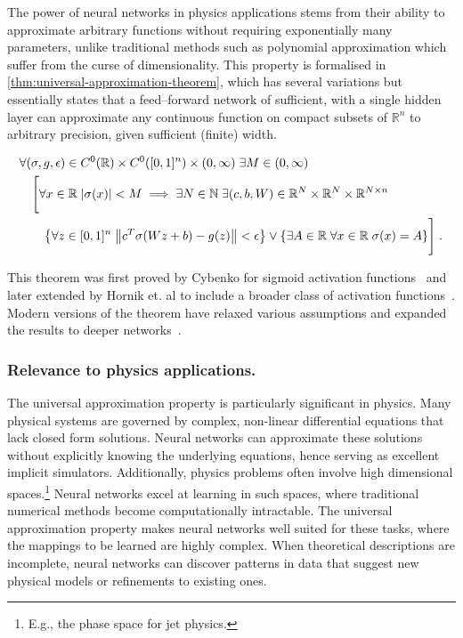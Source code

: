         The power of neural networks in physics applications stems from their ability to approximate arbitrary functions without requiring exponentially many parameters, unlike traditional methods such as polynomial approximation which suffer from the curse of dimensionality.
        This property is formalised in \cref{thm:universal-approximation-theorem}, which has several variations but essentially states that a feed--forward network of sufficient, with a single hidden layer can approximate any continuous function on compact subsets of \(\mathbb{R}^n\) to arbitrary precision, given sufficient (finite) width.
        \begin{theorem}
            \noproofref
            \label{thm:universal-approximation-theorem}
        \begin{align}
            &\forall (\sigma, g, \epsilon)\in C^0(\mathbb{R})\times C^0([0, 1]^n)\times (0,\infty)\;\exists M\in(0, \infty)\\
            \nonumber&\quad \Bigg[\forall x\in\mathbb{R}\;|\sigma(x)| < M \implies \exists N\in\mathbb{N}\;\exists (c, b, W)\in \mathbb{R}^N\times \mathbb{R}^N\times \mathbb{R}^{N\times n}\\
            \nonumber&\qquad\qty{\forall z\in[0, 1]^n\;\norm{c^T\sigma(Wz + b) - g(z)} <\epsilon} \lor \qty{\exists A\in\mathbb{R}\;\forall x\in\mathbb{R}\;\sigma(x) = A}\Bigg]\;.
            \end{align}
        \end{theorem}
        This theorem was first proved by Cybenko for sigmoid activation functions~\cite{cybenko_approximation_1989} and later extended by Hornik et. al to include a broader class of activation functions~\cite{hornik_multilayer_1989}.
        Modern versions of the theorem have relaxed various assumptions and expanded the results to deeper networks~\cite{augustine_survey_2024}.
        
        \subsubsection{Relevance to physics applications.}
            The universal approximation property is particularly significant in physics.
            Many physical systems are governed by complex, non-linear differential equations that lack closed form solutions.
            Neural networks can approximate these solutions without explicitly knowing the underlying equations, hence serving as excellent implicit simulators.
            Additionally, physics problems often involve high dimensional spaces.\footnote{E.g., the phase space for jet physics.}
            Neural networks excel at learning in such spaces, where traditional numerical methods become computationally intractable.
            The universal approximation property makes neural networks well suited for these tasks, where the mappings to be learned are highly complex.
            When theoretical descriptions are incomplete, neural networks can discover patterns in data that suggest new physical models or refinements to existing ones.
            
